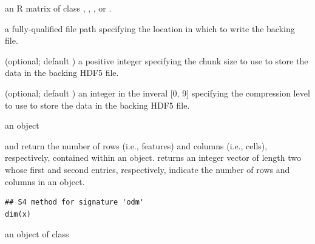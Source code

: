 \documentclass[a4paper]{book}
\begin{document}
%
\begin{Arguments}
\begin{ldescription}
\item[\code{mat}] an R matrix of class , , , or .

\item[\code{file\_to\_write}] a fully-qualified file path specifying the location in which to write the backing  file.

\item[\code{chunk\_size}] (optional; default ) a positive integer specifying the chunk size to use to store the data in the backing HDF5 file.

\item[\code{compression\_level}] (optional; default ) an integer in the inveral [0, 9] specifying the compression level to use to store the data in the backing HDF5 file.
\end{ldescription}
\end{Arguments}
%
\begin{Value}
an  object
\end{Value}
%
\begin{Examples}
\end{Examples}
%
\begin{Description}
 and  return the number of rows (i.e., features) and columns (i.e., cells), respectively, contained within an  object.  returns an integer vector of length two whose first and second entries, respectively, indicate the number of rows and columns in an  object.
\end{Description}
%
\begin{Usage}
\begin{verbatim}
## S4 method for signature 'odm'
dim(x)
\end{verbatim}
\end{Usage}
%
\begin{Arguments}
\begin{ldescription}
\item[\code{x}] an object of class 
\end{ldescription}
\end{Arguments}
\end{document}
